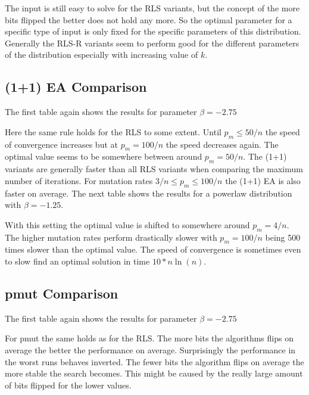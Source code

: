 

The input is still easy to solve for the RLS variants, but the concept of the more bits flipped the better does not hold any more.
So the optimal parameter for a specific type of input is only fixed for the specific parameters of this distribution.
Generally the RLS-R variants seem to perform good for the different parameters of the distribution especially with increasing value of $k$.
\subsection{(1+1) EA Comparison}
The first table again shows the results for parameter $\beta=-2.75$



Here the same rule holds for the RLS to some extent.
Until $p_m\le50/n$ the speed of convergence increases but at $p_m=100/n$ the speed decreases again.
The optimal value seems to be somewhere between around $p_m=50/n$.
The (1+1) variants are generally faster than all RLS variants when comparing the maximum number of iterations.
For mutation rates $3/n\le p_m \le 100/n$ the (1+1) EA is also faster on average.
The next table shows the results for a powerlaw distribution with $\beta=-1.25$.



With this setting the optimal value is shifted to somewhere around $p_m=4/n$.
The higher mutation rates perform drastically slower with $p_m=100/n$ being 500 times slower than the optimal value.
The speed of convergence is sometimes even to slow find an optimal solution in time $10*n\ln(n)$.
\subsection{pmut Comparison}
The first table again shows the results for parameter $\beta=-2.75$



For pmut the same holds as for the RLS.
The more bits the algorithms flips on average the better the performance on average.
Surprisingly the performance in the worst runs behaves inverted.
The fewer bits the algorithm flips on average the more stable the search becomes.
This might be caused by the really large amount of bits flipped for the lower values.



